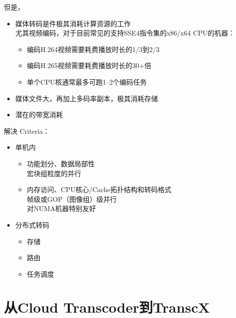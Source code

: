 \documentclass{beamer}
\begin{document}
\begin{frame}{但是，}
\pause
\begin{itemize}
\item 媒体转码是件极其消耗计算资源的工作\\ %
	尤其视频编码，对于目前常见的支持SSE4指令集的x86/x64 CPU的机器：
	\begin{itemize}
	\item  编码H.264视频需要耗费播放时长的1/3到2/3
	\item  编码H.265视频需要耗费播放时长的30+倍
	\item  单个CPU核通常最多可跑1--2个编码任务
	\end{itemize}
\item 媒体文件大，再加上多码率副本，极其消耗存储
\item 潜在的带宽消耗
\end{itemize}
\end{frame}

\begin{frame}{解决}
\pause
Criteria： \pause
\begin{itemize}
\item 单机内\\
	\begin{itemize}
	\item 功能划分、数据局部性\\
	宏块组粒度的并行
	\item 内存访问、CPU核心/Cache拓扑结构和转码格式\\
	帧级或GOP（图像组）级并行\\
	对NUMA机器特别友好
	\end{itemize}
\item 分布式转码
	\begin{itemize}
		\item 存储
		\item 路由
		\item 任务调度
	\end{itemize}
\end{itemize}
\end{frame}

\section{从Cloud Transcoder到TranscX}
\end{document}
